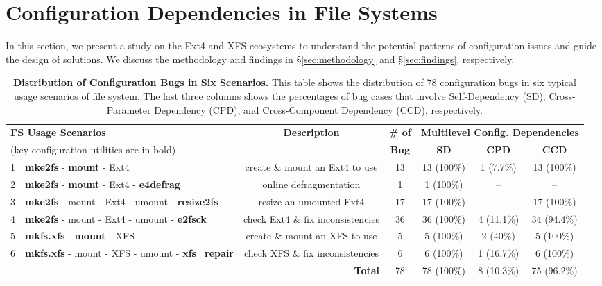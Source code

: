 
\section{Configuration Dependencies in File Systems}
\label{sec:bugstudy}
  \vspace{-0.05in}

 
In this section, we present a study on the Ext4 and XFS ecosystems to understand the potential patterns of configuration issues and guide the design of solutions. 
We discuss the methodology and  findings in \S\ref{sec:methodology}  and \S\ref{sec:findings}, respectively. 

\begin{table*}[t]
	\small
	\begin{center}
		\begin{tabular}{ l | l | c | c | c | c | c }
	\multicolumn{2}{l|}{\textbf{FS Usage Scenarios}} & \textbf{Description} & \textbf{ \# of}  & \multicolumn{3}{c}{\textbf{Multilevel Config. Dependencies}}\\
         \cline{5-7}
		
	\multicolumn{2}{l|}{	 {(key configuration utilities are in bold)}} &   &  \textbf{ Bug} &  \textbf{SD}  &   \textbf{CPD}  &  \textbf{CCD}    \\
					\hline
1 & \textbf{mke2fs} - \textbf{mount} - Ext4 & create \&	mount an Ext4 to use & 13  & 13 (100\%) & 1 (7.7\%) & 13 (100\%) \\
			\hline
2 & \textbf{mke2fs} - \textbf{mount} - Ext4 - \textbf{e4defrag} & online defragmentation & 1 &  1 (100\%)  & -- & -- \\
			\hline
3 & 	\textbf{mke2fs} - mount - Ext4 - umount - \textbf{{resize2fs}}  &  resize an umounted Ext4  & 17 &  17 (100\%)  & -- & 17 (100\%)\\
			\hline
4 &  \textbf{mke2fs} - mount - Ext4 - umount - \textbf{{e2fsck}}  &  check  Ext4 \& fix inconsistencies   & 36 &  36 (100\%) & 4 (11.1\%) & 34 (94.4\%)\\
\hline

5 &  \textbf{mkfs.xfs} - \textbf{mount} - XFS & create \&	mount an XFS to use & 5&5 (100\%)& 2 (40\%)& 5 (100\%)\\
 \hline
6 &  \textbf{mkfs.xfs} - mount - XFS - umount - \textbf{xfs\_repair} & check XFS   \& fix  inconsistencies &6 &6 (100\%) &1 (16.7\%) &6 (100\%)\\
 \hline

\multicolumn{3}{r|}{\textbf{Total}}  & 78 &  78  (100\%) & 8 (10.3\%) & 75 (96.2\%)  \\
\hline
		\end{tabular}
	\end{center}
	\caption{ {\bf Distribution of Configuration Bugs in Six Scenarios.} This table shows  the distribution of 78 configuration bugs in six typical usage  scenarios of file system. The last three columns shows the percentages of bug cases that involve Self-Dependency (SD), Cross-Parameter Dependency (CPD), and Cross-Component Dependency (CCD), respectively. 
}
	\label{tab:bugstudy}
\end{table*}




